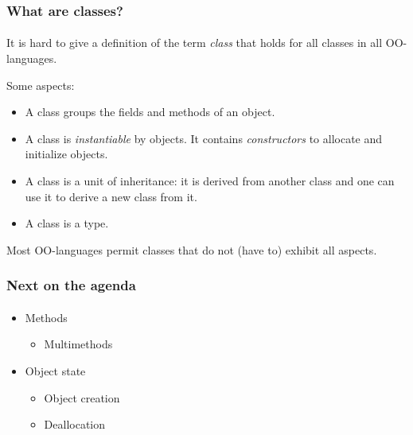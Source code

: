 \documentclass{beamer}
\begin{document}
\begin{frame}[fragile]
\frametitle{What are classes?}
\framesubtitle{}
It is hard to give a definition of the term \textit{class} that holds
for all classes in all OO-languages. 

\bigskip

Some aspects:

\begin{itemize}
\item A class groups the fields and methods of an object.
\item A class is \textit{instantiable} by objects.
It contains \textit{constructors} to allocate and initialize objects.
\item A class is a unit of inheritance: it is derived from another
class and one can use it to derive a new class from it. 
\item A class is a type. 
\end{itemize}
\bigskip

Most OO-languages permit classes that do not (have to) exhibit 
all aspects. 
\end{frame}

\begin{frame}[fragile]
\frametitle{Next on the agenda}
\framesubtitle{}
\begin{itemize}
\item Methods
\begin{itemize}
\item Multimethods
\end{itemize}
\item Object state
\begin{itemize}
\item Object creation 
\item Deallocation
\end{itemize}

\end{itemize}
\end{frame}
\end{document}
